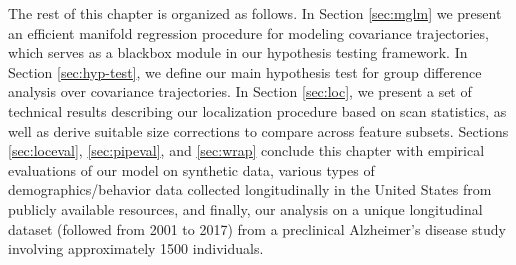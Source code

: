 The rest of this chapter is organized as follows. In Section \ref{sec:mglm} we present an efficient manifold regression procedure for 
modeling covariance trajectories, which serves as a blackbox module in our hypothesis testing framework. 
In Section \ref{sec:hyp-test}, we define our main hypothesis test for group difference analysis over covariance trajectories. 
In Section \ref{sec:loc}, we present a set of technical results describing our localization procedure based on scan statistics, 
as well as derive suitable size corrections to compare across feature subsets. Sections \ref{sec:loceval}, \ref{sec:pipeval}, and \ref{sec:wrap} conclude this chapter with
empirical evaluations of our model on synthetic data, various types of demographics/behavior data collected longitudinally 
in the United States from publicly available resources, and finally, our 
analysis on a unique longitudinal dataset (followed from 2001 to 2017) from a preclinical Alzheimer's disease study involving approximately 1500 individuals.
